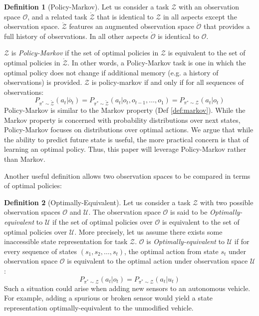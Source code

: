 \documentclass{article} %
\theoremstyle{definition}
\newtheorem{definition}{Definition}[section]
\begin{document}
\begin{definition}[Policy-Markov]
Let us consider a task $\mathcal{Z}$ with an observation space
$\mathcal{O}$, and a related task $\mathring{\mathcal{Z}}$ that is
identical to $\mathcal{Z}$ in all aspects except the observation
space. $\mathring{\mathcal{Z}}$ features an augmented observation
space $\mathring{\mathcal{O}}$ that provides a full history of
observations. In all other aspects $\mathring{\mathcal{O}}$ is
identical to $\mathcal{O}$.

$\mathcal{Z}$ is \textit{Policy-Markov} if the set of optimal policies
in $\mathcal{Z}$ is equivalent to the set of optimal policies in
$\mathring{\mathcal{Z}}$. In other words, a Policy-Markov task is one
in which the optimal policy does not change if additional memory
(e.g. a history of observations) is provided. $\mathcal{Z}$ is
policy-markov if and only if for all sequences of observations:
\[
P_{\pi^* \sim \mathring{\mathcal{Z}}}(a_t | \mathring{o_{t}}) = P_{\pi^* \sim \mathring{\mathcal{Z}}}(a_t | o_{t}, o_{t-1}, \dots, o_{1}) = P_{\pi^* \sim \mathcal{Z}}(a_t | o_{t})
\]
Policy-Markov is similar to the Markov property (Def
\ref{def:markov}). While the Markov property is concerned with
probability distributions over next states, Policy-Markov focuses on
distributions over optimal actions. We argue that while the ability to
predict future state is useful, the more practical concern is that of
learning an optimal policy. Thus, this paper will leverage
Policy-Markov rather than Markov.
\end{definition}

Another useful definition allows two observation spaces to be compared
in terms of optimal policies:

\begin{definition}[Optimally-Equivalent]
Let us consider a task $\mathcal{Z}$ with two possible observation
spaces $\mathcal{O}$ and $\mathcal{U}$. The observation space
$\mathcal{O}$ is said to be \textit{Optimally-equivalent} to
$\mathcal{U}$ if the set of optimal policies over $\mathcal{O}$ is
equivalent to the set of optimal policies over $\mathcal{U}$. More
precisely, let us assume there exists some inaccessible state
representation for task $\mathcal{Z}$. $\mathcal{O}$ is
\textit{Optimally-equivalent} to $\mathcal{U}$ if for every sequence
of states $(s_1, s_2, \dots, s_t)$, the optimal action from state
$s_t$ under observation space $\mathcal{O}$ is equivalent to the
optimal action under observation space $\mathcal{U}$:
\[
P_{\pi^* \sim \mathcal{Z}}(a_t | o_{t}) = P_{\pi^* \sim {\mathcal{Z}}}(a_t | u_{t})
\]
Such a situation could arise when adding new sensors to an autonomous
vehicle. For example, adding a spurious or broken sensor would yield a
state representation optimally-equivalent to the unmodified vehicle.
\end{definition}
\end{document}
